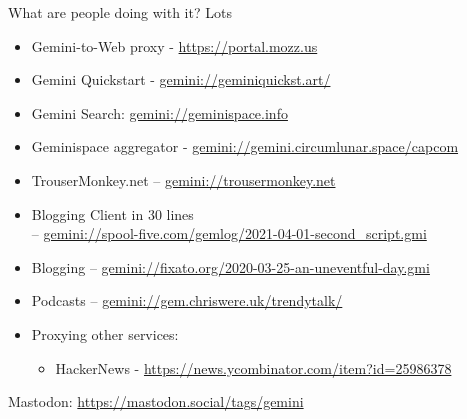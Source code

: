 \documentclass[presentation, 11pt,  aspectratio=169]{beamer}
\begin{document}
\begin{frame}[label={sec:org0fb3997}]{What are people doing with it?}
Lots\\
\begin{itemize}
\item \alert{Gemini-to-Web proxy} - \url{https://portal.mozz.us}\\
\item \alert{Gemini Quickstart} - \href{gemini://geminiquickst.art/}{gemini://geminiquickst.art/}\\
\item \alert{Gemini Search:} \href{gemini://geminispace.info}{gemini://geminispace.info}\\
\item \alert{Geminispace aggregator} - \href{gemini://gemini.circumlunar.space/capcom}{gemini://gemini.circumlunar.space/capcom}\\
\item \alert{TrouserMonkey.net} -- \href{gemini://trousermonkey.net}{gemini://trousermonkey.net}\\
\item \alert{Blogging Client in 30 lines} \\
-- \href{gemini://spool-five.com/gemlog/2021-04-01-second_script.gmi}{gemini://spool-five.com/gemlog/2021-04-01-second_script.gmi}\\
\item \alert{Blogging} -- \href{gemini://fixato.org/2020-03-25-an-uneventful-day.gmi}{gemini://fixato.org/2020-03-25-an-uneventful-day.gmi}\\
\item \alert{Podcasts} -- \href{gemini://gem.chriswere.uk/trendytalk/}{gemini://gem.chriswere.uk/trendytalk/}\\
\item \alert{Proxying other services:}\\
\begin{itemize}
\item HackerNews - \url{https://news.ycombinator.com/item?id=25986378}\\
\end{itemize}
\end{itemize}

Mastodon: \url{https://mastodon.social/tags/gemini}\\
\end{frame}
\end{document}
